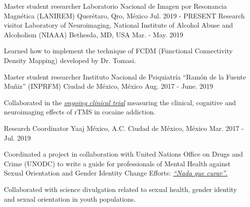 \vspace{-3.2mm}
\vspace{-1.5mm}
\begin{cventries}
    \cventry
        {Master student researcher}
        {Laboratorio Nacional de Imagen por Resonancia Magnética (LANIREM)}
        {Querétaro, Qro, México}
        {Jul. 2019 - PRESENT}
        { }
    \cventry
        {Research visitor}
        {Laboratory of Neuroimaging, National Institute of Alcohol Abuse and
        Alcoholism (NIAAA)}
        {Bethesda, MD, USA}
        {Mar. - May. 2019}
        {
            \begin{cvitems}
                \item {Learned how to implement the technique of FCDM (Functional
                        Connectivity Density Mapping) developed by Dr. Tomasi.}
            \end{cvitems}
        }
    \cventry
        {Master student researcher}
        {Instituto Nacional de Psiquiatría ``Ramón de la Fuente Muñiz''
        (INPRFM)}
        {Ciudad de México, México}
        {Aug. 2017 - June. 2019}
        {
            \begin{cvitems}
            \item {Collaborated in the
                    \href{https://clinicaltrials.gov/ct2/show/study/NCT02986438?term=Jorge+Gonzalez-Olvera&cntry=MX&rank=2}
                    {\textit{ongoing clinical trial}}
                    measuring the clinical, cognitive and neuroimaging effects of
                    rTMS in cocaine addiction.}
            \end{cvitems}
        }
    \cventry
        {Research Coordinator}
        {Yaaj México, A.C.}
        {Ciudad de México, México}
        {Mar. 2017 - Jul. 2019}
        {
            \begin{cvitems}
            \item {Coordinated a project in collaboration with
                    United Nations Office on Drugs and Crime (UNODC)
                    to write a guide for professionals of Mental Health against
                    Sexual Orientation and Gender Identity Change Efforts:
                    \href{https://www.unodc.org/documents/mexicoandcentralamerica/2019/GUIAECOSIGFINAL-compressed.pdf}
                    {\textit{``Nada que curar''}.}}
            \item {Collaborated with science divulgation related to sexual health,
                    gender identity and sexual orientation in youth populations.}

\end{cvitems}}
\end{cventries}
